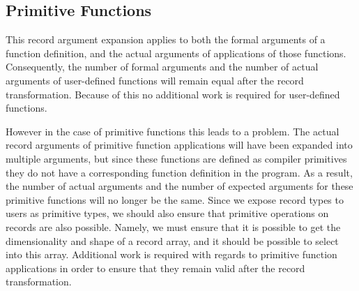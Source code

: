 







\subsection{Primitive Functions}

This record argument expansion applies to both the formal arguments of a function definition, and the actual arguments of applications of those functions.
Consequently, the number of formal arguments and the number of actual arguments of user-defined functions will remain equal after the record transformation.
Because of this no additional work is required for user-defined functions.

However in the case of primitive functions this leads to a problem.
The actual record arguments of primitive function applications will have been expanded into multiple arguments, but since these functions are defined as compiler primitives they do not have a corresponding function definition in the program.
As a result, the number of actual arguments and the number of expected arguments for these primitive functions will no longer be the same.
Since we expose record types to users as primitive types, we should also ensure that primitive operations on records are also possible.
Namely, we must ensure that it is possible to get the dimensionality and shape of a record array, and it should be possible to select into this array.
Additional work is required with regards to primitive function applications in order to ensure that they remain valid after the record transformation.

